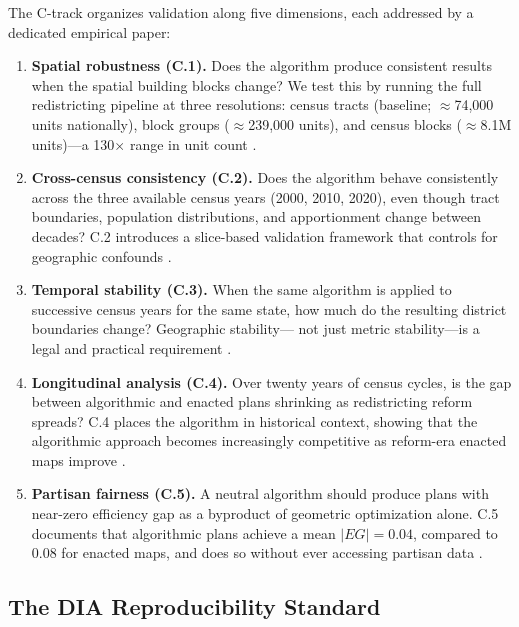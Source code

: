 The C-track organizes validation along five dimensions, each addressed
by a dedicated empirical paper:

\begin{enumerate}[leftmargin=*]
  \item \textbf{Spatial robustness (C.1).} Does the algorithm produce
    consistent results when the spatial building blocks change? We test
    this by running the full redistricting pipeline at three resolutions:
    census tracts (baseline; $\approx$74,000 units nationally), block
    groups ($\approx$239,000 units), and census blocks ($\approx$8.1M
    units)---a 130$\times$ range in unit count
    \citep{dellalibera2026c1}.

  \item \textbf{Cross-census consistency (C.2).} Does the algorithm
    behave consistently across the three available census years
    (2000, 2010, 2020), even though tract boundaries, population
    distributions, and apportionment change between decades?
    C.2 introduces a slice-based validation framework that controls
    for geographic confounds \citep{dellalibera2026c2}.

  \item \textbf{Temporal stability (C.3).} When the same algorithm is
    applied to successive census years for the same state, how much do
    the resulting district boundaries change? Geographic stability---
    not just metric stability---is a legal and practical requirement
    \citep{dellalibera2026c3}.

  \item \textbf{Longitudinal analysis (C.4).} Over twenty years of
    census cycles, is the gap between algorithmic and enacted plans
    shrinking as redistricting reform spreads? C.4 places the algorithm
    in historical context, showing that the algorithmic approach becomes
    increasingly competitive as reform-era enacted maps improve
    \citep{dellalibera2026c4}.

  \item \textbf{Partisan fairness (C.5).} A neutral algorithm should
    produce plans with near-zero efficiency gap as a byproduct of
    geometric optimization alone. C.5 documents that algorithmic plans
    achieve a mean $|EG| = 0.04$, compared to $0.08$ for enacted maps,
    and does so without ever accessing partisan data
    \citep{dellalibera2026c5}.
\end{enumerate}

\subsection{The DIA Reproducibility Standard}

